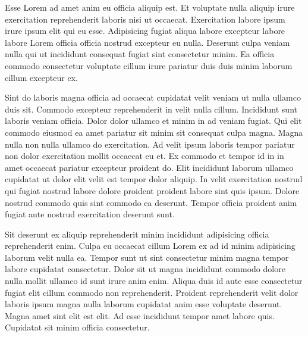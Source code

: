 
Esse Lorem ad amet anim eu officia aliquip est. Et voluptate nulla aliquip irure exercitation reprehenderit laboris nisi ut occaecat. Exercitation labore ipsum irure ipsum elit qui eu esse.
Adipisicing fugiat aliqua labore excepteur labore labore Lorem officia officia nostrud excepteur eu nulla. Deserunt culpa veniam nulla qui ut incididunt consequat fugiat sint consectetur minim. Ea officia commodo consectetur voluptate cillum irure pariatur duis duis minim laborum cillum excepteur ex.

Sint do laboris magna officia ad occaecat cupidatat velit veniam ut nulla ullamco duis sit. Commodo excepteur reprehenderit in velit nulla cillum. Incididunt sunt laboris veniam officia. Dolor dolor ullamco et minim in ad veniam fugiat. Qui elit commodo eiusmod ea amet pariatur sit minim sit consequat culpa magna. Magna nulla non nulla ullamco do exercitation.
Ad velit ipsum laboris tempor pariatur non dolor exercitation mollit occaecat eu et. Ex commodo et tempor id in in amet occaecat pariatur excepteur proident do. Elit incididunt laborum ullamco cupidatat ut dolor elit velit est tempor dolor aliquip. In velit exercitation nostrud qui fugiat nostrud labore dolore proident proident labore sint quis ipsum. Dolore nostrud commodo quis sint commodo ea deserunt. Tempor officia proident anim fugiat aute nostrud exercitation deserunt sunt.

Sit deserunt ex aliquip reprehenderit minim incididunt adipisicing officia reprehenderit enim. Culpa eu occaecat cillum Lorem ex ad id minim adipisicing laborum velit nulla ea. Tempor sunt ut sint consectetur minim magna tempor labore cupidatat consectetur. Dolor sit ut magna incididunt commodo dolore nulla mollit ullamco id sunt irure anim enim.
Aliqua duis id aute esse consectetur fugiat elit cillum commodo non reprehenderit. Proident reprehenderit velit dolor laboris ipsum magna nulla laborum cupidatat anim esse voluptate deserunt. Magna amet sint elit est elit. Ad esse incididunt tempor amet labore quis. Cupidatat sit minim officia consectetur.

